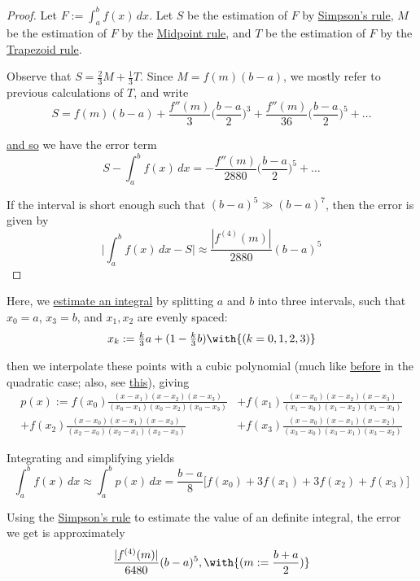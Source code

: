 \begin{proof}
  Let $F:=\int_a^bf(x)\,dx$. Let $S$ be the estimation of $F$ by
  \href{a4f90dc}{Simpson's rule}, $M$ be the estimation of $F$ by the
  \href{adcfc4b}{Midpoint rule}, and $T$ be the estimation of $F$ by the
  \href{c0b34f3}{Trapezoid rule}.

  Observe that $S=\frac23M+\frac13T$. Since $M=f(m)(b-a)$, we mostly refer to
  previous calculations of \href{cd8528b}{$T$}, and write
  $$
    S=f(m)(b-a)+\frac{f''(m)}{3}\biggl(\frac{b-a}{2}\biggr)^3
    +\frac{f''(m)}{36}\biggl(\frac{b-a}{2}\biggr)^5+\ldots
  $$

  \href{b024138}{and so} we have the error term
  $$
    S-\int_a^bf(x)\,dx=-\frac{f''(m)}{2880}\biggl(\frac{b-a}{2}\biggr)^5+\ldots
  $$

  If the interval is short enough such that $(b-a)^5\gg(b-a)^7$, then the error
  is given by
  $$
    \biggl|\int_a^bf(x)\,dx-S\biggr|\approx\frac {|f^{(4)}(m)|}{2880}(b-a)^5
  $$
\end{proof}

\label{f6c4ae6}

Here, we \href{db6037a}{estimate an integral} by splitting $a$ and $b$ into
three intervals, such that $x_0=a$, $x_3=b$, and $x_1,x_2$ are evenly spaced:
$$
  x_k:=\tfrac{k}3a+(1-\tfrac{k}3b)\with{(k=0,1,2,3)}
$$

then we interpolate these points with a cubic polynomial (much like
\href{a4f90dc}{before} in the quadratic case; also, see \href{dda7795}{this}),
giving
\begin{align*}
  p(x):=f(x_0)\frac{(x-x_1)(x-x_2)(x-x_3)}{(x_0-x_1)(x_0-x_2)(x_0-x_3)}
   &+f(x_1)\frac{(x-x_0)(x-x_2)(x-x_3)}{(x_1-x_0)(x_1-x_2)(x_1-x_3)} \\
  +f(x_2)\frac{(x-x_0)(x-x_1)(x-x_3)}{(x_2-x_0)(x_2-x_1)(x_2-x_3)}
   &+f(x_3)\frac{(x-x_0)(x-x_1)(x-x_2)}{(x_3-x_0)(x_3-x_1)(x_3-x_2)}
\end{align*}

Integrating and simplifying yields
$$
  \int_a^bf(x)\,dx\approx\int_a^bp(x)\,dx=\frac{b-a}8\bigl[f(x_0)+3f(x_1)+3f(x_2)+f(x_3)\bigr]
$$

\label{e8f005e}

Using the \href{a4f90dc}{Simpson's rule} to estimate the value of an definite
integral, the error we get is approximately
$$
  \frac{|f^{(4)}(m)|}{6480}(b-a)^5,\with{(m:=\frac{b+a}{2})}
$$

